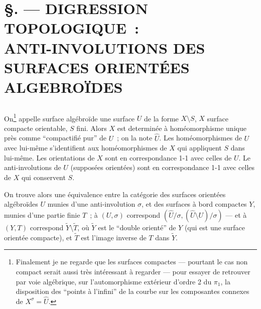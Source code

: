 

\chapter*{\S {}. --- DIGRESSION TOPOLOGIQUE~: \\ ANTI-INVOLUTIONS DES SURFACES ORIENTÉES ALGEBROÏDES}\thispagestyle{empty}
\label{sec:33}
\section*{}

On\footnote{Finalement je ne regarde que les surfaces compactes --- pourtant le cas non compact serait aussi très intéressant à regarder --- pour essayer de retrouver par voie algébrique, sur l'automorphisme extérieur d'ordre 2 du $\pi_1$, la disposition des ``points à  l'infini'' de la courbe sur les composantes connexes de $X^\sigma =\hat U$.} appelle surface algébroïde une surface $ U$ de la forme $X\setminus S$, $X$ surface compacte orientable, $S$ fini. Alors $X$ est determinée à homéomorphisme unique près comme ``compactifié pur'' de $ U$~; on la note $\hat  U$. Les homéomorphismes de $ U$ avec lui-même s'identifient aux homéomorphismes de $X$ qui appliquent $S$ dans lui-même. Les orientations de $X$ sont en correspondance 1-1 avec celles de $ U$.  Le anti-involutions de $ U$ (supposées orientées) sont en correspondance 1-1 avec celles de $X$ qui conservent $S$.

On trouve alors une équivalence entre la catégorie des surfaces orientées algébroïdes $ U$ munies d'une anti-involution $\sigma$, et des surfaces à bord compactes $Y$, munies d'une partie finie $T$~; à $( U,\sigma)$ correspond $(\hat{U}/\sigma,(\hat{U}\setminus U)/\sigma)$ --- et à $(Y,T)$ correspond $\tilde Y\setminus\tilde T$, où $\tilde Y$ est le ``double orienté'' de $Y$ (qui est une surface orientée compacte), et $\tilde T$ est l'image inverse de $T$ dans $\tilde Y$.

